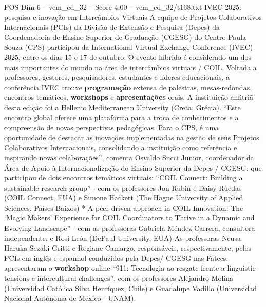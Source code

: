 \begin{textsample}{POS Dim 6 – vem\_ed\_32 – Score 4.00 – vem\_ed\_32/t168.txt}  \label{ex:f6_pos_007}
IVEC 2025: pesquisa e inovação em Intercâmbios Virtuais A equipe de Projetos Colaborativos Internacionais (PCIs) da Divisão de Extensão e Pesquisa (Depes) da Coordenadoria de Ensino Superior de Graduação (CGESG) do Centro Paula Souza (CPS) participou da International Virtual Exchange Conference (IVEC) 2025, entre os dias 15 e 17 de outubro.
O evento híbrido é considerado um dos mais importantes do mundo na área de intercâmbios virtuais / COIL.
Voltada a professores, gestores, pesquisadores, estudantes e líderes educacionais, a conferência IVEC trouxe \textbf{programação} extensa de palestras, mesas-redondas, encontros temáticos, \textbf{workshops} e \textbf{apresentações} orais.
A instituição anfitriã desta edição foi a Hellenic Mediterranean University (Creta, Grécia). “Este encontro global oferece uma plataforma para a troca de conhecimentos e a compreensão de novas perspectivas pedagógicas.
Para o CPS, é uma oportunidade de destacar as inovações implementadas na gestão de seus Projetos Colaborativos Internacionais, consolidando a instituição como referência e inspirando novas colaborações”, comenta Osvaldo Succi Junior, coordenador da Área de Apoio à Internacionalização do Ensino Superior da Depes / CGESG, que participou de dois encontros temáticos virtuais: “COIL Connect: Building a sustainable research group” - com os professores Jon Rubin e Daisy Ruedas (COIL Connect, EUA) e Simone Hackett (The Hague University of Applied Sciences, Países Baixos) * A peer-driven approach in COIL Innovation: The ‘Magic Makers’ Experience for COIL Coordinators to Thrive in a Dynamic and Evolving Landscape” - com as professoras Gabriela Méndez Carrera, consultora independente, e Rosi León (DePaul University, EUA) As professoras Neusa Haruka Sezaki Gritti e Regiane Camargo, responsáveis, respectivamente, pelos PCIs em inglês e espanhol conduzidos pela Depes/ CGESG nas Fatecs, apresentaram o \textbf{workshop} online “911: Tecnologia ao resgate frente a linguistic tensions e intercultural challenges”, com os professores Alejandro Molina (Universidad Católica Silva Henríquez, Chile) e Guadalupe Vadillo (Universidad Nacional Autónoma de México - UNAM).

\end{textsample}

